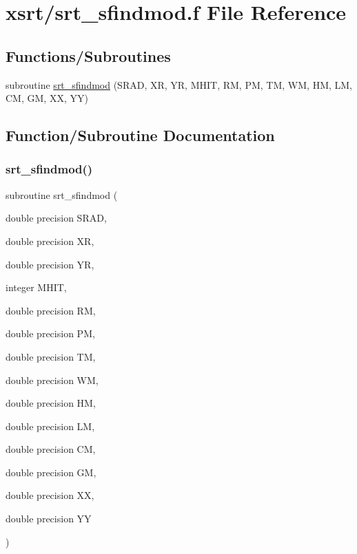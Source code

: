 \hypertarget{srt__sfindmod_8f}{}\section{xsrt/srt\+\_\+sfindmod.f File Reference}
\label{srt__sfindmod_8f}
\subsection*{Functions/\+Subroutines}
\begin{DoxyCompactItemize}
\item 
subroutine \hyperlink{srt__sfindmod_8f_acd025928d5badaa7110d81964bcb6817}{srt\+\_\+sfindmod} (S\+R\+AD, XR, YR, M\+H\+IT, RM, PM, TM, WM, HM, LM, CM, GM, XX, YY)
\end{DoxyCompactItemize}


\subsection{Function/\+Subroutine Documentation}
\mbox{\label{srt__sfindmod_8f_acd025928d5badaa7110d81964bcb6817}} 
\subsubsection{\texorpdfstring{srt\+\_\+sfindmod()}{srt\_sfindmod()}}
{\footnotesize\ttfamily subroutine srt\+\_\+sfindmod (\begin{DoxyParamCaption}\item[{double precision}]{S\+R\+AD,  }\item[{double precision}]{XR,  }\item[{double precision}]{YR,  }\item[{integer}]{M\+H\+IT,  }\item[{double precision}]{RM,  }\item[{double precision}]{PM,  }\item[{double precision}]{TM,  }\item[{double precision}]{WM,  }\item[{double precision}]{HM,  }\item[{double precision}]{LM,  }\item[{double precision}]{CM,  }\item[{double precision}]{GM,  }\item[{double precision}]{XX,  }\item[{double precision}]{YY }\end{DoxyParamCaption})}

